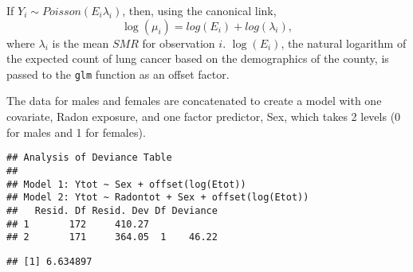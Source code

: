 \begin{solution}{6.6}

\begin{enumerate}
If $Y_{i}\sim Poisson(E_{i}\lambda_{i})$, then, using the canonical link, $$\log(\mu_{i})=log(E_{i})+log(\lambda_{i}),$$ where $\lambda_{i}$ is the mean $SMR$ for observation $i$. $\log(E_{i})$, the natural logarithm of the expected count of lung cancer based on the demographics of the county, is passed to the \texttt{glm} function as an offset factor.

The data for males and females are concatenated to create a model with one covariate, Radon exposure, and one factor predictor, Sex, which takes 2 levels (0 for males and 1 for females).
\begin{knitrout}
\color{fgcolor}\begin{kframe}
\begin{alltt}
 \hlkwb{<-} 
 \hlkwb{<-} 
 \hlkwb{<-} \hlstd{(}\hlstd{(}\hlstd{,}\hlstd{(}\hlstd{,} 
 \hlkwb{<-} \hlstd{)}

 \hlkwb{<-} \hlopt{~}\hlopt{+}\hlstd{(}
 \hlkwb{<-} \hlopt{~}\hlopt{+}\hlopt{+}\hlstd{(}

\end{alltt}
\begin{verbatim}
## Analysis of Deviance Table
##
## Model 1: Ytot ~ Sex + offset(log(Etot))
## Model 2: Ytot ~ Radontot + Sex + offset(log(Etot))
##   Resid. Df Resid. Dev Df Deviance
## 1       172     410.27
## 2       171     364.05  1    46.22
\end{verbatim}
\begin{alltt}
\hlstd{(}\hlstd{,}\hlstd{)}
\end{alltt}
\begin{verbatim}
## [1] 6.634897
\end{verbatim}
\end{kframe}
\end{knitrout}


\end{enumerate}
\end{solution}
